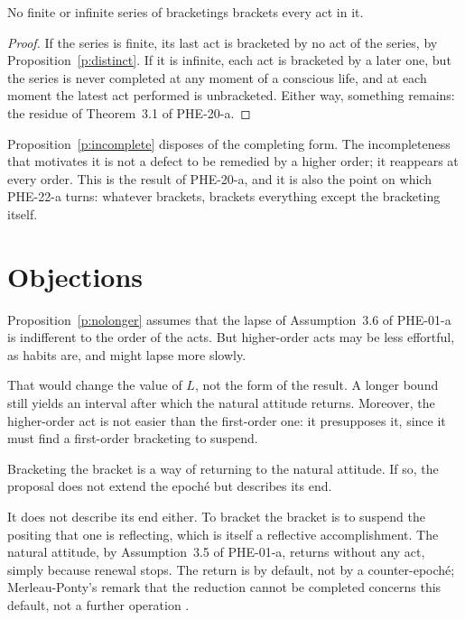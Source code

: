 \documentclass{situationist-preprint}
\begin{document}
\begin{proposition}\label{p:incomplete}
No finite or infinite series of bracketings brackets every act in it.
\end{proposition}

\begin{proof}
If the series is finite, its last act is bracketed by no act of the series, by Proposition~\ref{p:distinct}. If it is infinite, each act is bracketed by a later one, but the series is never completed at any moment of a conscious life, and at each moment the latest act performed is unbracketed. Either way, something remains: the residue of Theorem~3.1 of PHE-20-a.
\end{proof}

Proposition~\ref{p:incomplete} disposes of the completing form. The incompleteness that motivates it is not a defect to be remedied by a higher order; it reappears at every order. This is the result of PHE-20-a, and it is also the point on which PHE-22-a turns: whatever brackets, brackets everything except the bracketing itself.

\section{Objections}

\begin{objection}
Proposition~\ref{p:nolonger} assumes that the lapse of Assumption~3.6 of PHE-01-a is indifferent to the order of the acts. But higher-order acts may be less effortful, as habits are, and might lapse more slowly.
\end{objection}

\begin{reply}
That would change the value of $L$, not the form of the result. A longer bound still yields an interval after which the natural attitude returns. Moreover, the higher-order act is not easier than the first-order one: it presupposes it, since it must find a first-order bracketing to suspend.
\end{reply}

\begin{objection}
Bracketing the bracket is a way of returning to the natural attitude. If so, the proposal does not extend the epoché but describes its end.
\end{objection}

\begin{reply}
It does not describe its end either. To bracket the bracket is to suspend the positing that one is reflecting, which is itself a reflective accomplishment. The natural attitude, by Assumption~3.5 of PHE-01-a, returns without any act, simply because renewal stops. The return is by default, not by a counter-epoché; Merleau-Ponty's remark that the reduction cannot be completed concerns this default, not a further operation \citep{MerleauPonty1945}.
\end{reply}
\end{document}
